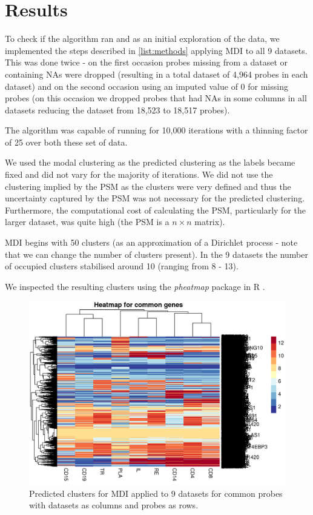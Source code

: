 \documentclass[12pt]{article} %
\begin{document}
	\section{Results}
	
	To check if the algorithm ran and as an initial exploration of the data, we implemented the steps described in \ref{list:methods} applying MDI to all 9 datasets. This was done twice - on the first occasion probes missing from a dataset or containing NAs were dropped (resulting in a total dataset of 4,964 probes in each dataset) and on the second occasion using an imputed value of 0 for missing probes (on this occasion we dropped probes that had NAs in some columns in all datasets reducing the dataset from 18,523 to 18,517 probes).
	
	The algorithm was capable of running for 10,000 iterations with a thinning factor of 25 over both these set of data.
	
	We used the modal clustering as the predicted clustering as the labels became fixed and did not vary for the majority of iterations. We did not use the clustering implied by the PSM as the clusters were very defined and thus the uncertainty captured by the PSM was not necessary for the predicted clustering. Furthermore, the computational cost of calculating the PSM, particularly for the larger dataset, was quite high (the PSM is a $n \times n$ matrix).
	
	MDI begins with 50 clusters (as an approximation of a Dirichlet process - note that we can change the number of clusters present). In the 9 datasets the number of occupied clusters stabilised around 10 (ranging from 8 - 13).
	
	We inspected the resulting clusters using the \emph{pheatmap} package \cite{KoldepheatmapPrettyHeatmaps2018} in R \cite{RCoreTeamLanguageEnvironmentStatistical2018}.
	
	\begin{figure}[h]
		\includegraphics[scale=1.0]{Images/Initial_analysis/mdi_1_heatmap-1.png}
		\caption{Predicted clusters for MDI applied to 9 datasets for common probes with datasets as columns and probes as rows.}
		\label{fig:naive_mdi_reduced}
	\end{figure}
\end{document}
